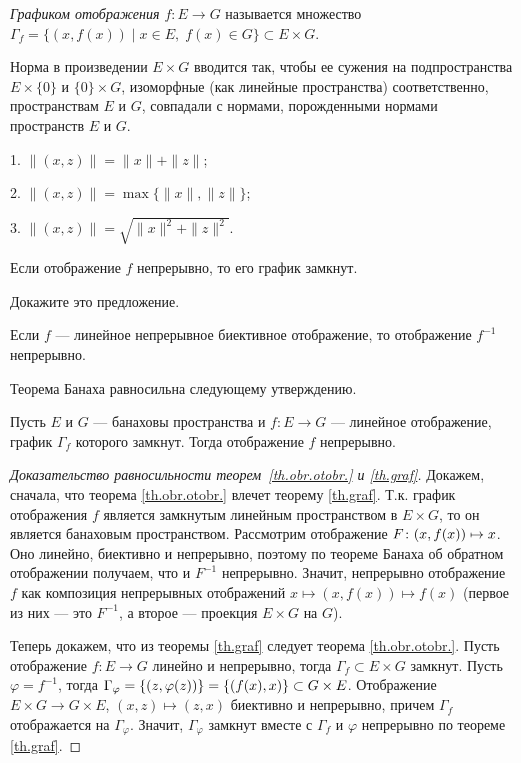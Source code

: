 \documentclass[10pt,titlepage, a4paper]{article}
\begin{document}
\begin{defen}
\emph{Графиком отображения $f\colon E\to G$} называется множество
$\Gamma_f=\{(x,f(x))\mid x\in E,\;f(x)\in G\}\subset E\times G$.
\end{defen}

Норма в произведении $E\times G$ вводится так, чтобы ее сужения на
подпространства $E\times\{0\}$ и $\{0\}\times G$, изоморфные (как
линейные пространства) соответственно, пространствам $E$ и $G$,
совпадали с нормами, порожденными нормами пространств $E$ и $G$.

\prim

1. $\|(x,z)\|=\|x\|+\|z\|$;

2. $\|(x,z)\|=\max\{\|x\|,\|z\|\}$;

3. $\|(x,z)\|=\sqrt{\|x\|^2+\|z\|^2}$.

\begin{predl}
Если отображение $f$ непрерывно, то его график замкнут.
\end{predl}

\begin{upr}
Докажите это предложение.
\end{upr}

\lecture

\begin{theorem}[Банах]\label{th.obr.otobr.}
Если $f$ --- линейное непрерывное биективное ото\-бражение, то
отображение $f^{-1}$ непрерывно.
\end{theorem}

Теорема Банаха равносильна следующему утверждению.

\begin{theorem}\label{th.graf}
Пусть $E$ и $G$ --- банаховы пространства и $f\colon E\to G$
--- линейное отображение, график $\Gamma_f$
которого замкнут. Тогда отображение $f$ непрерывно.
\end{theorem}

\begin{proof}[Доказательство равносильности теорем~\ref{th.obr.otobr.} и \ref{th.graf}]
Докажем, сначала, что теорема \ref{th.obr.otobr.} влечет теорему
\ref{th.graf}. Т.к. график отображения $f$ является замкнутым
линейным пространством в $E\times G$, то он является банаховым
пространством. Рассмотрим отображение $F\colon (x,f(x))\p\mapsto x$.
Оно линейно, биективно и непрерывно, поэтому по теореме Банаха об
обратном отображении получаем, что и $F^{-1}$ непрерывно. Значит,
непрерывно отображение $f$ как композиция непрерывных отображений
$x\mapsto (x,f(x))\mapsto f(x)$ (первое из них --- это $F^{-1}$, а
второе --- проекция $E\times G$ на $G$).

Теперь докажем, что из теоремы \ref{th.graf} следует теорема
\ref{th.obr.otobr.}. Пусть отображение $f\colon E\to G$ линейно и
непрерывно, тогда $\Gamma_f\subset E\times G$ замкнут. Пусть
$\varphi=f^{-1}$, тогда
$\Gamma_\varphi=\{(z,\varphi(z))\}\p=\{(f(x),x)\}\p\subset G\times
E$. Отображение $E\times G\to G\times E$, $(x,z)\mapsto (z,x)$
биективно и непрерывно, причем $\Gamma_f$ отображается на
$\Gamma_\varphi$. Значит, $\Gamma_\varphi$ замкнут вместе с
$\Gamma_f$ и $\varphi$ непрерывно по теореме \ref{th.graf}.
\end{proof}
\end{document}
